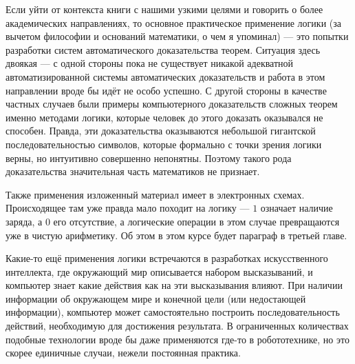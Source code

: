 Если уйти от контекста книги с нашими узкими целями и говорить о более академических направлениях, то основное практическое применение логики (за вычетом философии и оснований математики, о чем я упоминал) — это попытки разработки систем автоматического доказательства теорем. Ситуация здесь двоякая — с одной стороны пока не существует никакой адекватной автоматизированной системы автоматических доказательств и работа в этом направлении вроде бы идёт не особо успешно. С другой стороны в качестве частных случаев были примеры компьютерного доказательств сложных теорем именно методами логики, которые человек до этого доказать оказывался не способен. Правда, эти доказательства оказываются небольшой гигантской последовательностью символов, которые формально с точки зрения логики верны, но интуитивно совершенно непонятны. Поэтому такого рода доказательства значительная часть математиков не признает.

Также применения изложенный материал имеет в электронных схемах. Происходящее там уже правда мало походит на логику — $1$ означает наличие заряда, а $0$ его отсутствие, а логические операции в этом случае превращаются уже в чистую арифметику. Об этом в этом курсе будет параграф в третьей главе.

Какие-то ещё применения логики встречаются в разработках искусственного интеллекта, где окружающий мир описывается набором высказываний, и компьютер знает какие действия как на эти высказывания влияют. При наличии информации об окружающем мире и конечной цели (или недостающей информации), компьютер может самостоятельно построить последовательность действий, необходимую для достижения результата. В ограниченных количествах подобные технологии вроде бы даже применяются где-то в робототехнике, но это скорее единичные случаи, нежели постоянная практика.
